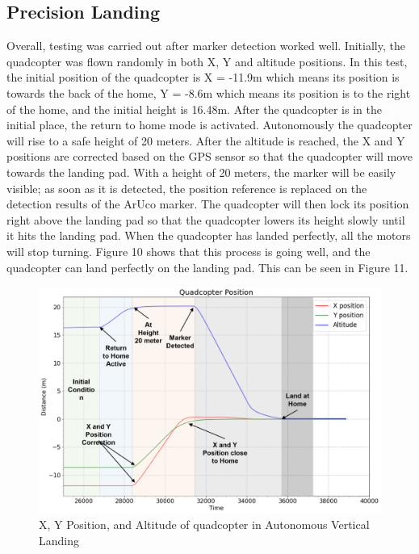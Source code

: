 \documentclass[a4paper]{jpconf}
\begin{document}
\subsection{Precision Landing}
Overall, testing was carried out after marker detection worked well. Initially, the quadcopter was flown randomly in both X, Y and altitude positions. In this test, the initial position of the quadcopter is X = -11.9m which means its position is towards the back of the home, Y = -8.6m which means its position is to the right of the home, and the initial height is 16.48m. After the quadcopter is in the initial place, the return to home mode is activated. Autonomously the quadcopter will rise to a safe height of 20 meters. After the altitude is reached, the X and Y positions are corrected based on the GPS sensor so that the quadcopter will move towards the landing pad. With a height of 20 meters, the marker will be easily visible; as soon as it is detected, the position reference is replaced on the detection results of the ArUco marker. The quadcopter will then lock its position right above the landing pad so that the quadcopter lowers its height slowly until it hits the landing pad. When the quadcopter has landed perfectly, all the motors will stop turning. Figure 10 shows that this process is going well, and the quadcopter can land perfectly on the landing pad. This can be seen in Figure 11.

\begin{figure}[h]
    \centering
    \includegraphics[width=30pc]{graph-response-position-edited.png}
    \caption{\label{label}X, Y Position, and Altitude of quadcopter in Autonomous Vertical Landing}
\end{figure}
\end{document}
